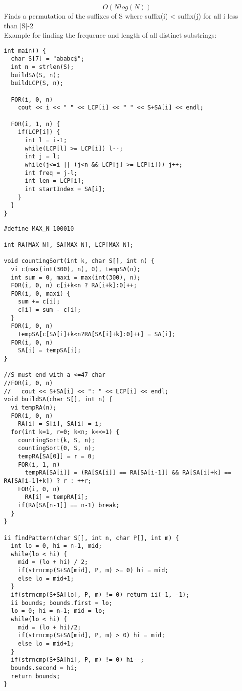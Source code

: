 \documentclass[11pt, oneside]{article}
\begin{document}
\[O(Nlog(N))\]
Finds a permutation of the suffixes of S where suffix(i) < suffix(j) for all i less than |S|-2\\
Example for finding the frequence and length of all distinct substrings:\\
\begin{lstlisting}
int main() {
  char S[7] = "ababc$";
  int n = strlen(S);
  buildSA(S, n);
  buildLCP(S, n);

  FOR(i, 0, n)
    cout << i << " " << LCP[i] << " " << S+SA[i] << endl;

  FOR(i, 1, n) {
    if(LCP[i]) {
      int l = i-1;
      while(LCP[l] >= LCP[i]) l--;
      int j = l;
      while(j<=i || (j<n && LCP[j] >= LCP[i])) j++;
      int freq = j-l;
      int len = LCP[i];
      int startIndex = SA[i];
    }
  }
}
\end{lstlisting}
\begin{lstlisting}
#define MAX_N 100010

int RA[MAX_N], SA[MAX_N], LCP[MAX_N];

void countingSort(int k, char S[], int n) {
  vi c(max(int(300), n), 0), tempSA(n);
  int sum = 0, maxi = max(int(300), n);
  FOR(i, 0, n) c[i+k<n ? RA[i+k]:0]++;
  FOR(i, 0, maxi) {
    sum += c[i];
    c[i] = sum - c[i];
  }
  FOR(i, 0, n)
    tempSA[c[SA[i]+k<n?RA[SA[i]+k]:0]++] = SA[i];
  FOR(i, 0, n)
    SA[i] = tempSA[i];
}

//S must end with a <=47 char
//FOR(i, 0, n) 
//   cout << S+SA[i] << ": " << LCP[i] << endl;
void buildSA(char S[], int n) {
  vi tempRA(n);
  FOR(i, 0, n)
    RA[i] = S[i], SA[i] = i;
  for(int k=1, r=0; k<n; k<<=1) {
    countingSort(k, S, n);
    countingSort(0, S, n);
    tempRA[SA[0]] = r = 0;
    FOR(i, 1, n)
      tempRA[SA[i]] = (RA[SA[i]] == RA[SA[i-1]] && RA[SA[i]+k] == RA[SA[i-1]+k]) ? r : ++r;
    FOR(i, 0, n)
      RA[i] = tempRA[i];
    if(RA[SA[n-1]] == n-1) break;
  }
}

ii findPattern(char S[], int n, char P[], int m) {
  int lo = 0, hi = n-1, mid;
  while(lo < hi) {
    mid = (lo + hi) / 2;
    if(strncmp(S+SA[mid], P, m) >= 0) hi = mid;
    else lo = mid+1;
  }
  if(strncmp(S+SA[lo], P, m) != 0) return ii(-1, -1);
  ii bounds; bounds.first = lo;
  lo = 0; hi = n-1; mid = lo;
  while(lo < hi) {
    mid = (lo + hi)/2;
    if(strncmp(S+SA[mid], P, m) > 0) hi = mid;
    else lo = mid+1;
  }
  if(strncmp(S+SA[hi], P, m) != 0) hi--;
  bounds.second = hi;
  return bounds;
}
\end{lstlisting}
\end{document}
